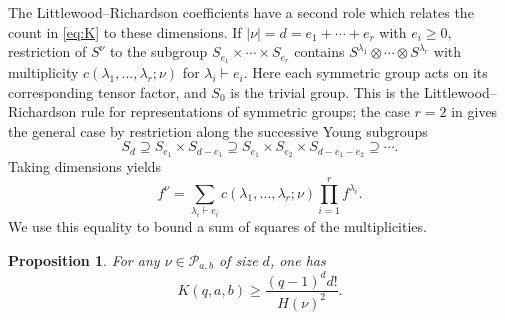 \documentclass[a4paper,reqno,10pt]{amsart}
\newtheorem{proposition}[theorem]{Proposition}
\theoremstyle{definition}
\numberwithin{equation}{section}
\newcommand{\parts}{\mathcal P}
\begin{document}
The Littlewood--Richardson coefficients have a second role which
relates the count in \eqref{eq:K} to these dimensions. If
$|\nu|=d=e_1+\cdots+e_r$ with $e_i\geq0$, restriction of $S^\nu$ to the
subgroup $S_{e_1}\times\cdots\times S_{e_r}$ contains
$S^{\lambda_1}\otimes\cdots\otimes S^{\lambda_r}$ with multiplicity
$c(\lambda_1,\ldots,\lambda_r;\nu)$ for $\lambda_i\vdash e_i$.
Here each symmetric group acts
on its corresponding tensor factor, and $S_0$ is the trivial group.
This is the Littlewood--Richardson rule for representations of
symmetric groups; the case $r=2$ in \cite[Section~4.1]{PPY} gives the
general case by restriction along the successive Young subgroups
\[
 S_d\supseteq S_{e_1}\times S_{d-e_1}
 \supseteq S_{e_1}\times S_{e_2}\times S_{d-e_1-e_2}
 \supseteq\cdots.
\]
Taking dimensions yields
\begin{equation}\label{eq:restriction-dimensions}
 f^\nu=\sum_{\lambda_i\vdash e_i}
 c(\lambda_1,\ldots,\lambda_r;\nu)\prod_{i=1}^r f^{\lambda_i}.
\end{equation}
We use this equality to bound a sum of squares of the multiplicities.

\begin{proposition}\label{prop:hook-bound}
For any $\nu\in\parts_{a,b}$ of size $d$, one has
\begin{equation}\label{eq:hook-bound}
 K(q,a,b)\geq\frac{(q-1)^d d!}{H(\nu)^2}.
\end{equation}
\end{proposition}
\end{document}
